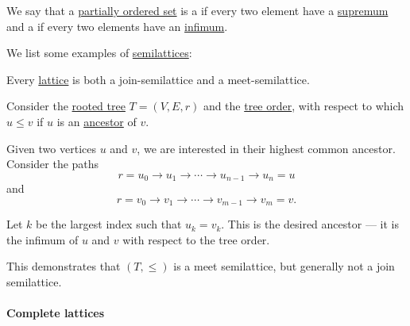 \begin{definition}\label{def:semilattice}
  We say that a \hyperref[def:partially_ordered_set]{partially ordered set} is a  if every two element have a \hyperref[def:extremal_points/supremum_and_infimum]{supremum} and a  if every two elements have an \hyperref[def:extremal_points/supremum_and_infimum]{infimum}.
\end{definition}

\begin{example}\label{ex:def:semilattice}
  We list some examples of \hyperref[def:semilattice]{semilattices}:
  \begin{thmenum}
     Every \hyperref[def:lattice]{lattice} is both a join-semilattice and a meet-semilattice.

     Consider the \hyperref[def:rooted_tree]{rooted tree} \( T = (V, E, r) \) and the \hyperref[def:rooted_tree/order]{tree order}, with respect to which \( u \leq v \) if \( u \) is an \hyperref[def:rooted_tree/ancestor_descendant]{ancestor} of \( v \).

    Given two vertices \( u \) and \( v \), we are interested in their highest common ancestor. Consider the paths
    \begin{equation*}
      r = u_0 \to u_1 \to \cdots \to u_{n-1} \to u_n = u
    \end{equation*}
    and
    \begin{equation*}
      r = v_0 \to v_1 \to \cdots \to v_{m-1} \to v_m = v.
    \end{equation*}

    Let \( k \) be the largest index such that \( u_k = v_k \). This is the desired ancestor --- it is the infimum of \( u \) and \( v \) with respect to the tree order.

    This demonstrates that \( (T, \leq) \) is a meet semilattice, but generally not a join semilattice.
  \end{thmenum}
\end{example}

\paragraph{Complete lattices}


